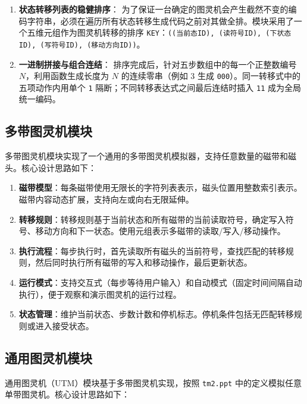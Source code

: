 \documentclass{sysucseexp}
\begin{document}
\begin{enumerate}
    \item \textbf{状态转移列表的稳健排序}：
    为了保证一台确定的图灵机会产生截然不变的编码字符串，必须在遍历所有状态转移生成代码之前对其做全排。模块采用了一个五维元组作为图灵机转移的排序 \texttt{KEY}：\texttt{((当前态ID), (读符号ID), (下状态ID), (写符号ID), (移动方向ID))}。

    \item \textbf{一进制拼接与组合连结}：
    排序完成后，针对五步数组中的每一个正整数编号 $N$，利用函数生成长度为 $N$ 的连续零串（例如 3 生成 \texttt{000}）。同一转移式中的五项动作内用单个 \texttt{1} 隔断；不同转移表达式之间最后连结时插入 \texttt{11} 成为全局统一编码。
\end{enumerate}

\subsection{多带图灵机模块}
多带图灵机模块实现了一个通用的多带图灵机模拟器，支持任意数量的磁带和磁头。核心设计思路如下：

\begin{enumerate}
    \item \textbf{磁带模型}：每条磁带使用无限长的字符列表表示，磁头位置用整数索引表示。磁带内容动态扩展，支持向左或向右无限延伸。
    
    \item \textbf{转移规则}：转移规则基于当前状态和所有磁带的当前读取符号，确定写入符号、移动方向和下一状态。使用元组表示多磁带的读取/写入/移动操作。
    
    \item \textbf{执行流程}：每步执行时，首先读取所有磁头的当前符号，查找匹配的转移规则，然后同时执行所有磁带的写入和移动操作，最后更新状态。
    
    \item \textbf{运行模式}：支持交互式（每步等待用户输入）和自动模式（固定时间间隔自动执行），便于观察和演示图灵机的运行过程。
    
    \item \textbf{状态管理}：维护当前状态、步数计数和停机标志。停机条件包括无匹配转移规则或进入接受状态。
\end{enumerate}

\subsection{通用图灵机模块}
通用图灵机（UTM）模块基于多带图灵机实现，按照 \texttt{tm2.ppt} 中的定义模拟任意单带图灵机。核心设计思路如下：
\end{document}
